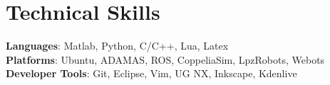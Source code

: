 \documentclass[letterpaper,11pt]{article}
\newcommand{\resumeItem}[1]{
  \item\small{
    {#1 \vspace{-2pt}}
  }
}
\newcommand{\resumeItemListStart}{\begin{itemize}}
\newcommand{\resumeItemListEnd}{\end{itemize}\vspace{-5pt}}
\begin{document}
\section{Technical Skills}
\begin{itemize}[leftmargin=0.15in, label={}]
\small{\item{
\textbf{Languages}{: Matlab, Python, C/C++, Lua, Latex} \\
\textbf{Platforms}{: Ubuntu, ADAMAS, ROS, CoppeliaSim, LpzRobots, Webots} \\
\textbf{Developer Tools}{: Git, Eclipse, Vim, UG NX, Inkscape, Kdenlive} \\
}}
\end{itemize}

\end{document}

